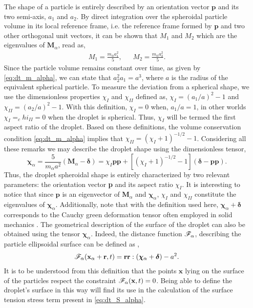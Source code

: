 The shape of a particle is entirely described by an orientation vector $\textbf{p}$ and its two semi-axis, $a_1$ and $a_2$.  
By direct integration over the spheroidal particle volume in its local reference frame, i.e. the reference frame formed by $\textbf{p}$ and two other orthogonal unit vectors, it can be shown that $M_1$ and $M_2$ which are the eigenvalues of $\textbf{M}_\alpha$, read as,
\begin{align*}
    M_1 = \frac{m_\alpha a_1^2}{5},
    && M_2 = \frac{m_\alpha a_2^2}{5}.
\end{align*}
Since the particle volume remains constant over time, as given by  \ref{eq:dt_m_alpha}, we can state that $a_2^2 a_1 =a^3$, where $a$ is the radius of the equivalent spherical particle.
To measure the deviation from a spherical shape, we use the dimensionless properties $\chi_I$ and $\chi_{II}$ defined as, $\chi_I = (a_1/a)^2 - 1$ and $\chi_{II} = (a_2/a)^2 - 1$. 
With this definition, $\chi_I = 0$ when, $a_1/a =1$, in other worlds $\chi_I =_chi_{II} = 0$ when the droplet is spherical. 
Thus, $\chi_I$ will be termed the first aspect ratio of the droplet.  
Based on these definitions, the volume conservation condition \eqref{eq:dt_m_alpha} implies that $\chi_{II} = (\chi_I + 1)^{-1/2} - 1$.
Considering all these remarks we may describe the droplet shape using the dimensionless tensor, 
\begin{equation*}
    \bm\chi_\alpha
    = \frac{5}{m_\alpha a^2}(\textbf{M}_\alpha - \bm\delta)
    = \chi_I \textbf{pp}
        +[(\chi_I + 1)^{-1/2} - 1 ] (\bm\delta - \textbf{pp}). 
\end{equation*}
Thus, the droplet spheroidal shape is entirely characterized by two relevant parameters: the orientation vector \textbf{p} and its aspect ratio $\chi_I$.
It is interesting to notice that since $\textbf{p}$ is an eigenvector of $\textbf{M}_\alpha$ and $\bm\chi_\alpha$, $\chi_I$ and $\chi_{II}$ constitute the eigenvalues of $\bm\chi_\alpha$. 
Additionally, note that with the definition used here, $\bm\chi_\alpha +\bm\delta$ corresponds to the Cauchy green deformation tensor often employed in solid mechanics \citep{mwasame2018macroscopic}. 
The geometrical description of the surface of the droplet can also be obtained using the tensor $\bm\chi_\alpha$. 
Indeed, the distance function  $\mathscr{F}_\alpha$, describing the particle ellipsoidal surface can be defined as \citep{nadim1996concise},  
\begin{equation*}
    \FF_\alpha(\textbf{x}_\alpha +\textbf{r},t) = \textbf{rr}:(\bm\chi_\alpha +\bm\delta)-a^2.  
    \label{eq:distance_function}
\end{equation*}
It is to be understood from this definition that the points $\textbf{x}$ lying on the surface of the particles respect the constraint $\mathscr{F}_\alpha(\textbf{x},t) = 0$. 
Being able to define the droplet's surface in this way will find its use in the calculation of the surface tension stress term present in \ref{eq:dt_S_alpha}. 

